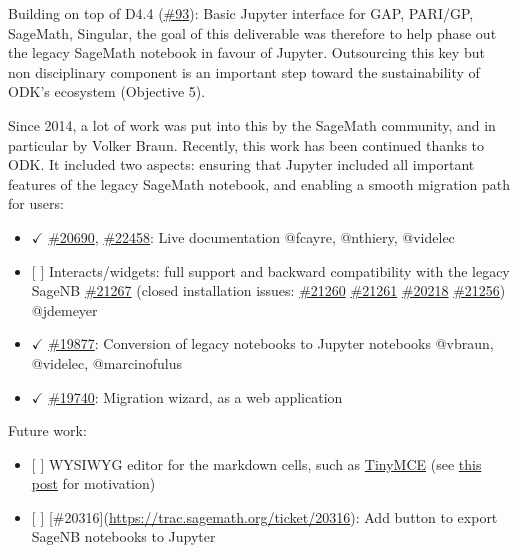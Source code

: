 Building on top of D4.4
(\href{https://github.com/OpenDreamKit/OpenDreamKit/issues/93}{\#93}):
Basic Jupyter interface for GAP, PARI/GP, SageMath, Singular, the goal
of this deliverable was therefore to help phase out the legacy SageMath
notebook in favour of Jupyter. Outsourcing this key but non disciplinary
component is an important step toward the sustainability of ODK's
ecosystem (Objective 5).

Since 2014, a lot of work was put into this by the SageMath community,
and in particular by Volker Braun. Recently, this work has been
continued thanks to ODK. It included two aspects: ensuring that Jupyter
included all important features of the legacy SageMath notebook, and
enabling a smooth migration path for users:

\begin{itemize}
\tightlist
\item
  \(\checkmark\) \href{http://trac.sagemath.org/ticket/20690}{\#20690},
  \href{http://trac.sagemath.org/ticket/22458}{\#22458}: Live
  documentation @fcayre, @nthiery, @videlec
\item
  {[} {]} Interacts/widgets: full support and backward compatibility
  with the legacy SageNB
  \href{https://trac.sagemath.org/ticket/21267}{\#21267} (closed
  installation issues:
  \href{https://trac.sagemath.org/ticket/21260}{\#21260}
  \href{https://trac.sagemath.org/ticket/21261}{\#21261}
  \href{https://trac.sagemath.org/ticket/20218}{\#20218}
  \href{https://trac.sagemath.org/ticket/21256}{\#21256}) @jdemeyer
\item
  \(\checkmark\) \href{https://trac.sagemath.org/ticket/19877}{\#19877}:
  Conversion of legacy notebooks to Jupyter notebooks @vbraun, @videlec,
  @marcinofulus
\item
  \(\checkmark\) \href{https://trac.sagemath.org/ticket/19740}{\#19740}:
  Migration wizard, as a web application
\end{itemize}

Future work:

\begin{itemize}
\tightlist
\item
  {[} {]} WYSIWYG editor for the markdown cells, such as
  \href{https://www.tinymce.com/}{TinyMCE} (see
  \href{https://groups.google.com/d/msg/sage-devel/t11JSxxCgpw/BR0Bt638AgAJ}{this
  post} for motivation)
\item
  {[} {]} {[}\#20316{]}(\url{https://trac.sagemath.org/ticket/20316}):
  Add button to export SageNB notebooks to Jupyter
\end{itemize}
